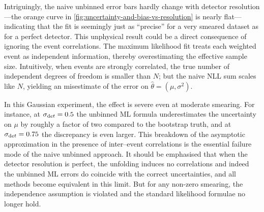             Intriguingly, the naive unbinned error bars hardly change with detector resolution---the orange curve in \cref{fig:uncertainty-and-bias-vs-resolution} is nearly flat---indicating that the fit is seemingly just as ``precise'' for a very smeared dataset as for a perfect detector.
            This unphysical result could be a direct consequence of ignoring the event correlations.
            The maximum likelihood fit treats each weighted event as independent information, thereby overestimating the effective sample size.
            Intuitively, when events are strongly correlated, the true number of independent degrees of freedom is smaller than $N$; but the naive NLL sum scales like $N$, yielding an misestimate of the error on $\hat\theta = (\mu, \sigma^2)$.
            
            In this Gaussian experiment, the effect is severe even at moderate smearing.
            For instance, at $\sigma_{\text det}=0.5$ the unbinned ML formula underestimates the uncertainty on $\mu$ by roughly a factor of two compared to the bootstrap truth, and at $\sigma_{\text det}=0.75$ the discrepancy is even larger.
            This breakdown of the asymptotic approximation in the presence of inter--event correlations is the essential failure mode of the naive unbinned approach.
            It should be emphasised that when the detector resolution is perfect, the unfolding induces no correlations and indeed the unbinned ML errors do coincide with the correct uncertainties, and all methods become equivalent in this limit.
            But for any non-zero smearing, the independence assumption is violated and the standard likelihood formulae no longer hold.
    
